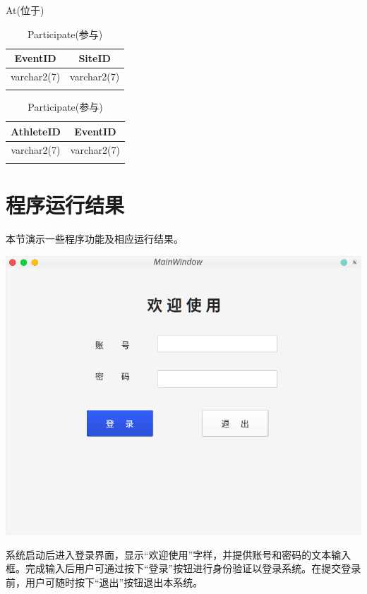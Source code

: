 \documentclass[a4paper,UTF8]{article}
\begin{document}
\begin{table}[H]
	\caption{At(位于)}
	\label{table:Tab_db_at}
	\begin{tabular}{|c|c|}
		\hline\noalign{\smallskip}
		EventID & SiteID \\
		\hline
		varchar2(7) & varchar2(7) \\
		\noalign{\smallskip}
		\hline
		\noalign{\smallskip}
	\end{tabular}

	\caption{Participate(参与)}
	\label{table:Tab_db_participate}
	\begin{tabular}{|c|c|}
		\hline\noalign{\smallskip}
		AthleteID & EventID \\
		\hline
		varchar2(7) & varchar2(7) \\
		\noalign{\smallskip}
		\hline
		\noalign{\smallskip}
	\end{tabular}
\end{table}


\section{程序运行结果}
本节演示一些程序功能及相应运行结果。

{\centering\includegraphics[width=1\columnwidth]{1.png}
	
}

系统启动后进入登录界面，显示“欢迎使用”字样，并提供账号和密码的文本输入框。完成输入后用户可通过按下“登录”按钮进行身份验证以登录系统。在提交登录前，用户可随时按下“退出”按钮退出本系统。
\end{document}
